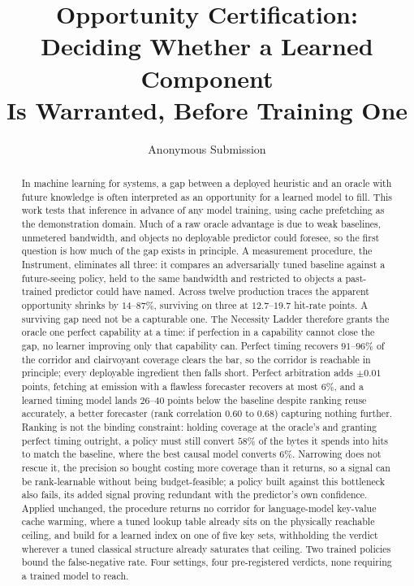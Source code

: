 \documentclass[letterpaper]{article} %
\title{Opportunity Certification: Deciding Whether a Learned Component\\ Is Warranted, Before Training One}
\author{Anonymous Submission}
\begin{document}
\maketitle

\begin{abstract}
\noindent In machine learning for systems, a gap between a deployed heuristic and an oracle with future knowledge is often interpreted as an opportunity for a learned model to fill. This work tests that inference in advance of any model training, using cache prefetching as the demonstration domain. Much of a raw oracle advantage is due to weak baselines, unmetered bandwidth, and objects no deployable predictor could foresee, so the first question is how much of the gap exists in principle. A measurement procedure, the Instrument, eliminates all three: it compares an adversarially tuned baseline against a future-seeing policy, held to the same bandwidth and restricted to objects a past-trained predictor could have named. Across twelve production traces the apparent opportunity shrinks by $14$--$87\%$, surviving on three at $12.7$--$19.7$ hit-rate points. A surviving gap need not be a capturable one. The Necessity Ladder therefore grants the oracle one perfect capability at a time: if perfection in a capability cannot close the gap, no learner improving only that capability can. Perfect timing recovers $91$--$96\%$ of the corridor and clairvoyant coverage clears the bar, so the corridor is reachable in principle; every deployable ingredient then falls short. Perfect arbitration adds $\pm 0.01$ points, fetching at emission with a flawless forecaster recovers at most $6\%$, and a learned timing model lands $26$--$40$ points below the baseline despite ranking reuse accurately, a better forecaster (rank correlation $0.60$ to $0.68$) capturing nothing further. Ranking is not the binding constraint: holding coverage at the oracle's and granting perfect timing outright, a policy must still convert $58\%$ of the bytes it spends into hits to match the baseline, where the best causal model converts $6\%$. Narrowing does not rescue it, the precision so bought costing more coverage than it returns, so a signal can be rank-learnable without being budget-feasible; a policy built against this bottleneck also fails, its added signal proving redundant with the predictor's own confidence. Applied unchanged, the procedure returns no corridor for language-model key-value cache warming, where a tuned lookup table already sits on the physically reachable ceiling, and build for a learned index on one of five key sets, withholding the verdict wherever a tuned classical structure already saturates that ceiling. Two trained policies bound the false-negative rate. Four settings, four pre-registered verdicts, none requiring a trained model to reach.
\end{abstract}
\end{document}
